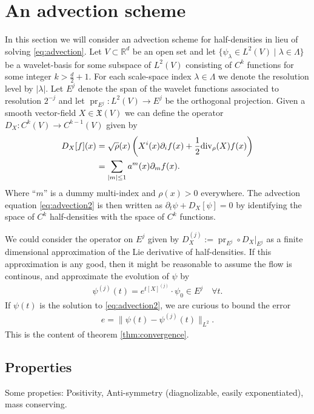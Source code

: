 \documentclass[letterpaper, 10 pt, conference]{ieeeconf}
\DeclareMathOperator{\pr}{pr}
\begin{document}
\section{An advection scheme}
\label{sec:scheme}
  In this section we will consider an advection scheme
  for half-densities in lieu of solving \eqref{eq:advection}.
  Let $V \subset \mathbb{R}^d$ be an open set and let
  $\{ \psi_\lambda \in L^2(V)  \mid \lambda \in \Lambda\}$
  be a wavelet-basis for some
  subspace of $L^2(V)$ consisting of $C^k$ functions for some
  integer $k > \frac{d}{2} + 1$.
  For each scale-space index $\lambda \in \Lambda$
  we denote the resolution level by $|\lambda|$.
  Let $E^j$ denote the span of the wavelet functions
  associated to resolution $2^{-j}$ and let 
  $\pr_{E^j}: L^2(V) \to E^j$ be the orthogonal projection.
  Given a smooth vector-field $X \in \mathfrak{X}(V)$
  we can define the operator $D_X : C^k(V) \to C^{k-1}(V)$ 
  given by
  \begin{align*}
    D_X[f](x) &=  \sqrt{\rho}(x) \left(  X^i (x) \partial_if(x) 
      + \frac{1}{2} {\rm div}_{\rho}(X) f(x) \right)\\
    &= \sum_{ | m | \leq 1 } a^m(x) \partial_{m}f(x).
  \end{align*}
  Where ``$m$'' is a dummy multi-index and $\rho(x) > 0$ everywhere.
  The advection equation \eqref{eq:advection2} is then written
  as $\partial_t \psi + D_X[\psi] = 0$ by identifying the space
  of $C^k$ half-densities with the space of $C^k$ functions.

  We could consider the operator on $E^j$ given by 
  $D_X^{(j)} := \pr_{E^j} \circ \left. D_X \right|_{E^j}$
  as a finite dimensional approximation of the Lie derivative of half-densities.
  If this approximation is any good, then it might be reasonable to assume
  the flow is continous, and approximate the evolution of $\psi$ by
  \begin{align*}
    \psi^{(j)}(t) = e^{t [X]^{(j)} } \cdot \psi_0 \in E^j \quad \forall t.
  \end{align*}
  If $\psi(t)$ is the solution to \eqref{eq:advection2},
  we are curious to bound the error
  \begin{align*}
    e = \| \psi(t) - \psi^{(j)}(t) \|_{L^2}.
  \end{align*}
  This is the content of theorem \ref{thm:convergence}.

\subsection{Properties}
\label{sec:properties}
Some propeties:  Positivity,
Anti-symmetry (diagnolizable, easily exponentiated),
mass conserving.
\end{document}
